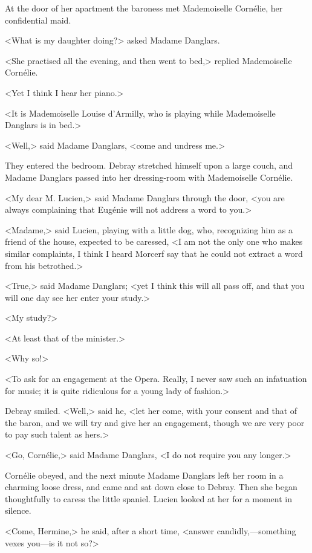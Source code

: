  At the door of her apartment the baroness met Mademoiselle Cornélie, her confidential maid. 

 <What is my daughter doing?> asked Madame Danglars. 

 <She practised all the evening, and then went to bed,> replied Mademoiselle Cornélie. 

 <Yet I think I hear her piano.> 

 <It is Mademoiselle Louise d'Armilly, who is playing while Mademoiselle Danglars is in bed.> 

 <Well,> said Madame Danglars, <come and undress me.> 

 They entered the bedroom. Debray stretched himself upon a large couch, and Madame Danglars passed into her dressing-room with Mademoiselle Cornélie. 

 <My dear M. Lucien,> said Madame Danglars through the door, <you are always complaining that Eugénie will not address a word to you.> 

 <Madame,> said Lucien, playing with a little dog, who, recognizing him as a friend of the house, expected to be caressed, <I am not the only one who makes similar complaints, I think I heard Morcerf say that he could not extract a word from his betrothed.> 

 <True,> said Madame Danglars; <yet I think this will all pass off, and that you will one day see her enter your study.> 

 <My study?> 

 <At least that of the minister.> 

 <Why so!> 

 <To ask for an engagement at the Opera. Really, I never saw such an infatuation for music; it is quite ridiculous for a young lady of fashion.> 

 Debray smiled. <Well,> said he, <let her come, with your consent and that of the baron, and we will try and give her an engagement, though we are very poor to pay such talent as hers.> 

 <Go, Cornélie,> said Madame Danglars, <I do not require you any longer.> 

 Cornélie obeyed, and the next minute Madame Danglars left her room in a charming loose dress, and came and sat down close to Debray. Then she began thoughtfully to caress the little spaniel. Lucien looked at her for a moment in silence. 

 <Come, Hermine,> he said, after a short time, <answer candidly,—something vexes you—is it not so?>

